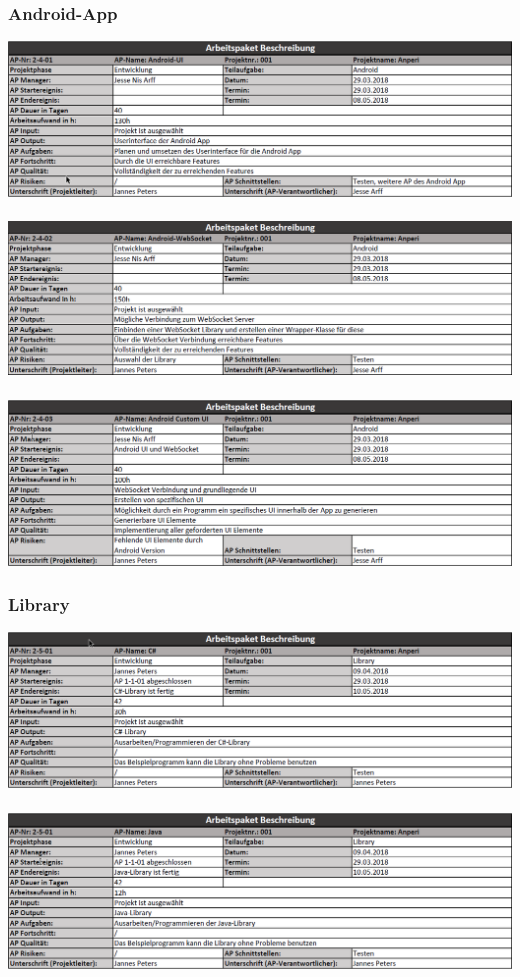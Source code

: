 \documentclass{scrartcl}
\begin{document}
\subsubsection{Android-App}
\includegraphics[scale=0.6]{AP2-4-01.png}
\\
\\
\includegraphics[scale=0.6]{AP2-4-02.png}
\\
\\
\includegraphics[scale=0.6]{AP2-4-03.png}
\subsubsection{Library}
\includegraphics[scale=0.6]{AP2-5-01.png}
\\
\\
\includegraphics[scale=0.6]{AP2-5-02.png}
\end{document}

